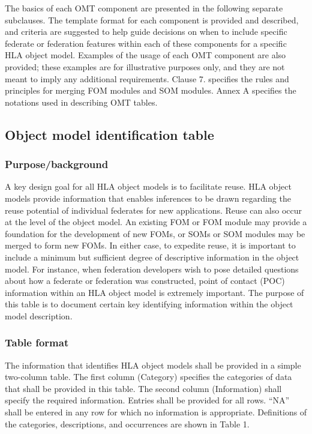 The basics of each OMT component are presented in the following separate subclauses. The template format for each component is provided and described, and criteria are suggested to help guide decisions on when to include specific federate or federation features within each of these components for a specific HLA object model. Examples of the usage of each OMT component are also provided; these examples are for illustrative purposes only, and they are not meant to imply any additional requirements. Clause 7. specifies the rules and principles for merging FOM modules and SOM modules. Annex A specifies the notations used in describing OMT tables.

\subsection{Object model identification table}

\subsubsection{Purpose/background}
A key design goal for all HLA object models is to facilitate reuse. HLA object models provide information that enables inferences to be drawn regarding the reuse potential of individual federates for new applications. Reuse can also occur at the level of the object model. An existing FOM or FOM module may provide a foundation for the development of new FOMs, or SOMs or SOM modules may be merged to form new FOMs. In either case, to expedite reuse, it is important to include a minimum but sufficient degree of descriptive information in the object model. For instance, when federation developers wish to pose detailed questions about how a federate or federation was constructed, point of contact (POC) information within an HLA object model is extremely important. The purpose of this table is to document certain key identifying information within the object model description.

\subsubsection{Table format}
The information that identifies HLA object models shall be provided in a simple two-column table. The first column (Category) specifies the categories of data that shall be provided in this table. The second column (Information) shall specify the required information. Entries shall be provided for all rows. ``NA'' shall be entered in any row for which no information is appropriate. Definitions of the categories, descriptions, and occurrences are shown in Table 1.

